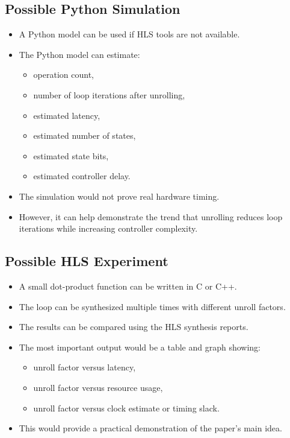 \documentclass[conference]{IEEEtran}
\begin{document}
\subsection{Possible Python Simulation}

\begin{itemize}
    \item A Python model can be used if HLS tools are not available.
    \item The Python model can estimate:
    \begin{itemize}
        \item operation count,
        \item number of loop iterations after unrolling,
        \item estimated latency,
        \item estimated number of states,
        \item estimated state bits,
        \item estimated controller delay.
    \end{itemize}

    \item The simulation would not prove real hardware timing.
    \item However, it can help demonstrate the trend that unrolling reduces loop iterations while increasing controller complexity.
\end{itemize}

\subsection{Possible HLS Experiment}

\begin{itemize}
    \item A small dot-product function can be written in C or C++.
    \item The loop can be synthesized multiple times with different unroll factors.
    \item The results can be compared using the HLS synthesis reports.
    \item The most important output would be a table and graph showing:
    \begin{itemize}
        \item unroll factor versus latency,
        \item unroll factor versus resource usage,
        \item unroll factor versus clock estimate or timing slack.
    \end{itemize}

    \item This would provide a practical demonstration of the paper's main idea.
\end{itemize}
\end{document}
